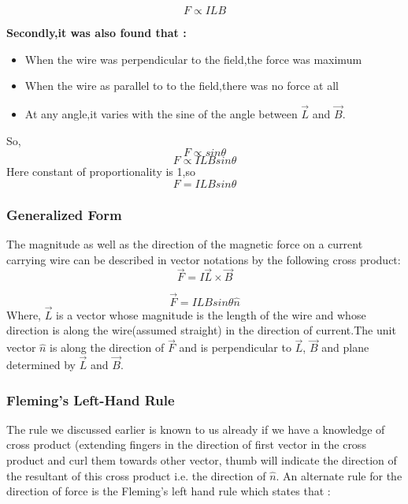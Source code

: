 \begin{equation}
 F \propto ILB \nonumber
\end{equation}

\textbf{Secondly,it was also found that :}
 \begin{itemize}
    \item When the wire was perpendicular to the field,the force was maximum
    \item When the wire as parallel to to the field,there was no force at all
    \item At any angle,it varies with the sine of the angle between $\vec{L}$ and $\vec{B}$.
\end{itemize}

So,
\begin{equation}
  F \propto sin\theta \nonumber
\end{equation}
\begin{equation}
  F \propto ILBsin\theta \nonumber
\end{equation}
Here constant of proportionality is 1,so
\begin{equation}
  F = ILBsin\theta \nonumber
\end{equation}
\subsubsection{Generalized Form}
The magnitude as well as the direction of the magnetic force on a current carrying wire can be described in vector notations by the following cross product:
\begin{equation}
  \vec{F} =I \vec{L}\times \vec{B} \nonumber
\end{equation}

\begin{equation}
\vec{F} =ILBsin\theta \hat{n} \nonumber
\end{equation}
Where,
$\vec{L}$ is a vector whose magnitude is the length of the wire
and whose direction is along the wire(assumed straight) in the
direction of current.The unit vector $\hat{n}$ is along the direction
of $\vec{F}$ and is perpendicular to $\vec{L}$, $\vec{B}$ and 
plane determined by $\vec{L}$ and $\vec{B}$.

\subsubsection{Fleming's Left-Hand Rule}
The rule we discussed earlier is known to us already if we have 
a knowledge  of cross product (extending fingers in the direction of 
first vector in the cross product and curl them towards other vector,
thumb will indicate the direction of the resultant of this cross
product i.e. the direction of $\hat{n}$. An alternate rule for the
direction of force is the Fleming’s left hand rule which states that :

